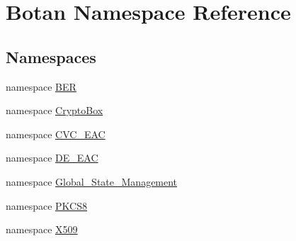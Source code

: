 \hypertarget{namespaceBotan}{\section{Botan Namespace Reference}
\label{namespaceBotan}
}
\subsection*{Namespaces}
\begin{DoxyCompactItemize}
\item 
namespace \hyperlink{namespaceBotan_1_1BER}{B\-E\-R}
\item 
namespace \hyperlink{namespaceBotan_1_1CryptoBox}{Crypto\-Box}
\item 
namespace \hyperlink{namespaceBotan_1_1CVC__EAC}{C\-V\-C\-\_\-\-E\-A\-C}
\item 
namespace \hyperlink{namespaceBotan_1_1DE__EAC}{D\-E\-\_\-\-E\-A\-C}
\item 
namespace \hyperlink{namespaceBotan_1_1Global__State__Management}{Global\-\_\-\-State\-\_\-\-Management}
\item 
namespace \hyperlink{namespaceBotan_1_1PKCS8}{P\-K\-C\-S8}
\item 
namespace \hyperlink{namespaceBotan_1_1X509}{X509}
\end{DoxyCompactItemize}
